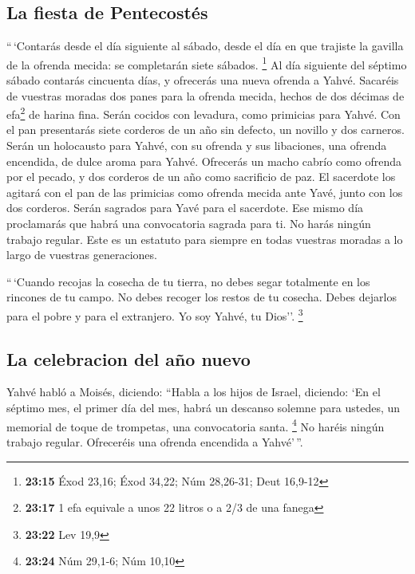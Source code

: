 \hypertarget{la-fiesta-de-pentecostuxe9s}{%
\subsection{La fiesta de
Pentecostés}\label{la-fiesta-de-pentecostuxe9s}}

 ``\,`Contarás desde el día siguiente al sábado, desde el
día en que trajiste la gavilla de la ofrenda mecida: se completarán
siete sábados. \footnote{\textbf{23:15} Éxod 23,16; Éxod 34,22; Núm
  28,26-31; Deut 16,9-12}  Al día siguiente del séptimo
sábado contarás cincuenta días, y ofrecerás una nueva ofrenda a Yahvé.
 Sacaréis de vuestras moradas dos panes para la ofrenda
mecida, hechos de dos décimas de efa\footnote{\textbf{23:17} 1 efa
  equivale a unos 22 litros o a 2/3 de una fanega} de harina fina. Serán
cocidos con levadura, como primicias para Yahvé.  Con el
pan presentarás siete corderos de un año sin defecto, un novillo y dos
carneros. Serán un holocausto para Yahvé, con su ofrenda y sus
libaciones, una ofrenda encendida, de dulce aroma para Yahvé.
 Ofrecerás un macho cabrío como ofrenda por el pecado, y
dos corderos de un año como sacrificio de paz.  El
sacerdote los agitará con el pan de las primicias como ofrenda mecida
ante Yavé, junto con los dos corderos. Serán sagrados para Yavé para el
sacerdote.  Ese mismo día proclamarás que habrá una
convocatoria sagrada para ti. No harás ningún trabajo regular. Este es
un estatuto para siempre en todas vuestras moradas a lo largo de
vuestras generaciones.

 ``\,`Cuando recojas la cosecha de tu tierra, no debes
segar totalmente en los rincones de tu campo. No debes recoger los
restos de tu cosecha. Debes dejarlos para el pobre y para el extranjero.
Yo soy Yahvé, tu Dios''. \footnote{\textbf{23:22} Lev 19,9}

\hypertarget{la-celebracion-del-auxf1o-nuevo}{%
\subsection{La celebracion del año
nuevo}\label{la-celebracion-del-auxf1o-nuevo}}

 Yahvé habló a Moisés, diciendo:  ``Habla
a los hijos de Israel, diciendo: `En el séptimo mes, el primer día del
mes, habrá un descanso solemne para ustedes, un memorial de toque de
trompetas, una convocatoria santa. \footnote{\textbf{23:24} Núm 29,1-6;
  Núm 10,10}  No haréis ningún trabajo regular.
Ofreceréis una ofrenda encendida a Yahvé'\,''.

